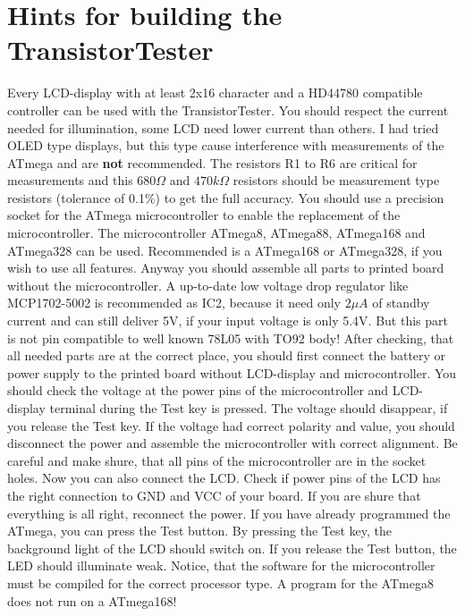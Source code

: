 \section{Hints for building the TransistorTester}
Every LCD-display with at least 2x16 character and a HD44780 compatible controller
can be used with the TransistorTester. You should respect the current needed for
illumination, some LCD need lower current than others.
I had tried OLED type displays, but this type cause interference with measurements
of the ATmega and are {\bf not} recommended.
The resistors R1 to R6 are critical for measurements and this \(680\Omega\) and
\(470k\Omega\) resistors should be measurement type resistors (tolerance of 0.1\%) to
get the full accuracy.
You should use a precision socket for the ATmega microcontroller to enable
the replacement of the microcontroller.
The microcontroller ATmega8, ATmega88, ATmega168 and ATmega328 can be used.
Recommended is a ATmega168 or ATmega328, if you wish to use all features.
Anyway you should assemble all parts to printed board without the microcontroller.
A up-to-date low voltage drop regulator like MCP1702-5002 is recommended as IC2, because it
need only \(2\mu A\) of standby current and can still deliver 5V, if your input
voltage is only 5.4V. But this part is not pin compatible to well known 78L05 with TO92 body!
After checking, that all needed parts are at the correct place, you should
first connect the battery or power supply to the printed board without LCD-display
and microcontroller. You should check the voltage at the power pins of the
microcontroller and LCD-display terminal during the Test key is pressed.
The voltage should disappear, if you release the Test key.
If the voltage had correct polarity and value,
you should disconnect the power and assemble the microcontroller with correct
alignment. Be careful and make shure, that all pins of the microcontroller
are in the socket holes.
Now you can also connect the LCD. Check if power pins of the LCD has the right connection to
GND and VCC of your board. If you are shure that everything is all right, reconnect the power. 
If you have already programmed the ATmega, you can press the Test button.
By pressing the Test key, the background light of the LCD should switch on.
If you release the Test button, the LED should illuminate weak.
Notice, that the software for the microcontroller must be compiled for the
correct processor type. A program for the ATmega8 does not run on a ATmega168!


